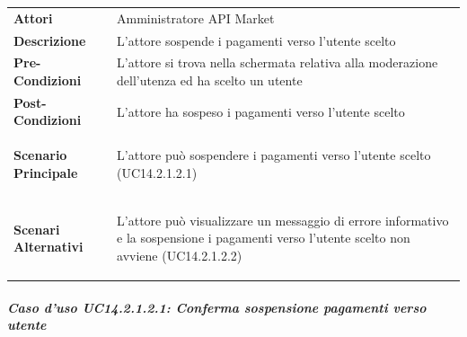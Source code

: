 \begin{minipage}{\linewidth}
	\begin{tabular}{ l | p{11cm}}
		\hline
		\rowcolor{Gray}
		\multicolumn{2}{c}{UC14.2.1.2 - Sospensione prelievi conto utente} \\
		\hline
		\textbf{Attori} & Amministratore API Market \\
		\textbf{Descrizione} & L'attore sospende i pagamenti verso l'utente scelto \\
		\textbf{Pre-Condizioni} & L'attore si trova nella schermata relativa alla moderazione dell'utenza ed ha scelto un utente \\
		\textbf{Post-Condizioni} & L'attore ha sospeso i pagamenti verso l'utente scelto \\
		\textbf{Scenario Principale} & 
		\begin{enumerate*}[label=(\arabic*.),itemjoin={\newline}]
			\item L'attore può sospendere i pagamenti verso l'utente scelto (UC14.2.1.2.1)
		\end{enumerate*}\\
		\textbf{Scenari Alternativi} & 
		\begin{enumerate*}[label=(\arabic*.),itemjoin={\newline}]
			\item L'attore può visualizzare un messaggio di errore informativo e la sospensione i pagamenti verso l'utente scelto non avviene (UC14.2.1.2.2)
		\end{enumerate*}\\
	\end{tabular}
\end{minipage}

\subparagraph{Caso d'uso UC14.2.1.2.1: Conferma sospensione pagamenti verso utente}
\label{UC14_2_1_2_1}

